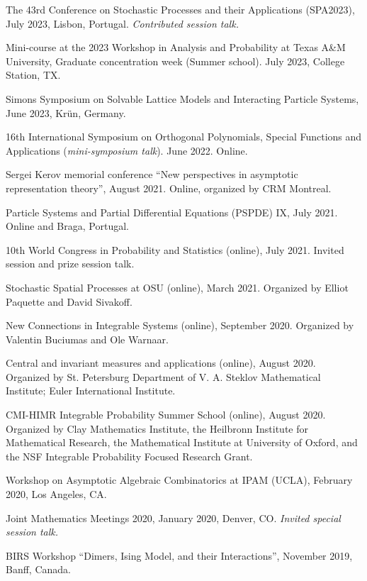 \documentclass[letterpaper,11pt]{article}
\begin{document}
\begin{etaremune}
	\item
	The 43rd Conference on Stochastic Processes and their Applications (SPA2023), July 2023, Lisbon, Portugal.
	\emph{Contributed session talk.}

	\item
	Mini-course at the
	2023 Workshop in Analysis and Probability at Texas A\&M University, Graduate concentration week (Summer school). July 2023, College Station, TX.

	\item
	Simons Symposium on Solvable Lattice Models and Interacting Particle Systems, June 2023, Kr\"un, Germany.
	\item
	16th International Symposium on Orthogonal Polynomials, Special Functions and Applications (\emph{mini-symposium talk}).
	June 2022. Online.
\item
	Sergei Kerov memorial conference
	``New perspectives in asymptotic representation theory'',
	August 2021. Online, organized by CRM Montreal.
\item
	Particle Systems and Partial Differential Equations (PSPDE) IX,
	July 2021. Online and Braga, Portugal.
\item
	10th World Congress in Probability and Statistics (online),
	July 2021.
	Invited session and prize session talk.
\item
	Stochastic Spatial Processes at OSU (online),
	March 2021.
	Organized by Elliot Paquette and David Sivakoff.
\item New Connections in Integrable Systems (online),
	September 2020.
	Organized by Valentin Buciumas and Ole Warnaar.
\item
	Central and invariant measures and applications (online),
	August 2020.
	Organized by St. Petersburg Department of V. A. Steklov Mathematical Institute; Euler International Institute.
\item
	CMI-HIMR Integrable Probability Summer School (online),
	August 2020.
	Organized by
	Clay Mathematics Institute, the Heilbronn Institute for Mathematical Research,
	the Mathematical Institute at University of Oxford,
	and the NSF Integrable Probability Focused Research Grant.
\item
	Workshop on Asymptotic Algebraic Combinatorics at
	IPAM (UCLA), February 2020,
	Los Angeles, CA.
\item Joint Mathematics Meetings 2020,
	January 2020,
	Denver, CO.
	\emph{Invited special session talk.}
	\item
		BIRS Workshop ``Dimers, Ising Model, and their Interactions'',
		November 2019, Banff, Canada.

\end{etaremune}
\end{document}
